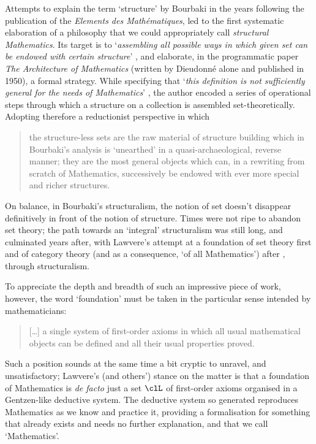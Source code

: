 Attempts to explain the term `structure' by Bourbaki in the years following the publication of the \textit{Elements des Mathématiques}, led to the first systematic elaboration of a philosophy that we could appropriately call \textit{structural Mathematics}. Its target is to `\textit{assembling all possible ways in which given set can be endowed with certain structure}' \cite{kromer2007tool}, and elaborate, in the programmatic paper \textit{The Architecture of Mathematics} (written by Dieudonné alone and published in 1950), a formal strategy. While specifying that `\textit{this definition is not sufficiently general for the needs of Mathematics}' \cite{Bourb50}, the author encoded a series of operational steps through which a structure on a collection is assembled set-theoretically. Adopting therefore a reductionist perspective in which
\begin{quote}
	the structure-less sets are the raw material of structure building which in Bourbaki’s analysis is `unearthed' in a quasi\hyp{}archaeological, reverse manner; they are the most general objects which can, in a rewriting from scratch of Mathematics, successively be endowed with ever more special and richer structures.\hfill  \cite{kromer2007tool}
\end{quote}
On balance, in Bourbaki's structuralism, the notion of set doesn't disappear definitively in front of the notion of structure. Times were not ripe to abandon set theory; the path towards an `integral' structuralism was still long, and culminated years after, with Lawvere's attempt at a foundation  of set theory first \cite{lawvere1964elementary} and  of category theory (and as a consequence, `of all Mathematics') after \cite{lajolla}, through structuralism.

To appreciate the depth and breadth of such an impressive piece of work, however, the word `foundation' must be taken in the particular sense intended by mathematicians:
\begin{quote}
	[\dots\unkern] a single system of first-order axioms in which all usual mathematical objects can be defined and all their usual properties proved.
\end{quote}
Such a position sounds at the same time a bit cryptic to unravel, and unsatisfactory; Lawvere's (and others') stance on the matter is that a foundation of Mathematics is \emph{de facto} just a set $\clL$ of first-order axioms organised in a Gentzen-like deductive system. The deductive system so generated reproduces Mathematics as we know and practice it, providing a formalisation for something that already exists and needs no further explanation, and that we call `Mathematics'.

